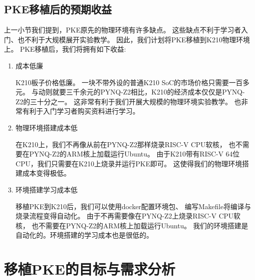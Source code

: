 \subsection{PKE移植后的预期收益}

上一小节我们提到，PKE原先的物理环境有许多缺点。
这些缺点不利于学习者入门、也不利于大规模展开实验教学。
因此，我们计划将PKE移植到K210物理环境上。
PKE移植后，我们将拥有如下收益:

\begin{enumerate}
    \item 成本低廉
    
    K210板子价格低廉。
    一块不带外设的普通K210 SoC的市场价格只需要一百多元。
    与动则就要三千余元的PYNQ-Z2相比，K210的经济成本仅仅是PYNQ-Z2的三十分之一。
    这非常有利于我们开展大规模的物理环境实验教学。
    也非常有利于入门学习者购买资料进行学习。

    \item 物理环境搭建成本低
    
    在K210上，我们不再像从前在PYNQ-Z2那样烧录RISC-V CPU软核，
    也不需要在PYNQ-Z2的ARM核上加载运行Ubuntu。
    由于K210带有RISC-V 64位CPU，我们只需要在K210上烧录并运行PKE即可。
    这使得我们的物理环境搭建成本变得极低。

    \item 环境搭建学习成本低
    
    移植PKE到K210后，我们可以使用docker配置环境包、
    编写Makefile将编译与烧录流程变得自动化。
    由于不再需要像在PYNQ-Z2上烧录RISC-V CPU软核，
    也不需要在PYNQ-Z2的ARM核上加载运行Ubuntu。
    我们的环境搭建是自动化的。环境搭建的学习成本也是很低的。

\end{enumerate}


\section{移植PKE的目标与需求分析}

